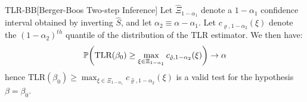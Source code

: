 \begin{propositionp}{TLR-BB}[Berger-Boos Two-step Inference]\label{prop:tlr-bb}
Let \(\hat \Xi_{1-\alpha_1}\) denote a \(1-\alpha_1\) confidence interval obtained by inverting \(\hat S\), and let \(\alpha_2 \equiv \alpha -\alpha_1 \). Let \(c_{\varrho,1-\alpha_2}(\xi) \) denote the \((1-\alpha_2)^{th}\) {quantile} of the distribution of the TLR estimator.
  We then have:
\begin{align*}
    \P\!\left(\textrm{TLR}(\beta_0) \geq \max_{\xi \in \Xi_{1-\alpha_1}} c_{\hat\varrho,1-\alpha_2}(\xi)\right) \to \alpha
\end{align*}
hence \(\textrm{TLR}(\beta_0) \geq \max_{\xi \in \Xi_{1-\alpha_1}} c_{\hat\varrho,1-\alpha_2}(\xi)\)  is a valid test for the hypothesis \(\beta=\beta_0\).
\end{propositionp}
